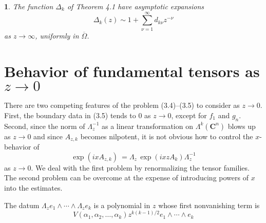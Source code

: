 \documentclass{surv-l}
\theoremstyle{plain}
\newtheorem{cor}[theorem]{\sc{Corollary}}
\theoremstyle{definition}
\numberwithin{equation}{chapter}
\begin{document}
\begin{cor}\label{chap01:coro5.18}
The function $\Delta_{k}$ of Theorem \emph{4.1} have asymptotic expansions
\setcounter{equation}{18}
\begin{equation}\label{eq5.19}
\Delta_{k}(z)\sim 1+\sum_{\nu=1}^{\infty}d_{k\nu}z^{-\nu}
\end{equation}
as $z\rightarrow\infty$, uniformly in $\overline{\Omega}$.
\end{cor}

\section{Behavior of fundamental tensors as $z\rightarrow
0$}\label{sec6}There are two competing features of the problem
(3.4)--(3.5) to consider as $z\rightarrow 0$. First, the boundary data in (3.5) tends to $0$ as $z\rightarrow 0$, except for $f_{1}$ and $g_{n}$. Second, since the norm of $\Lambda_{z}^{-1}$ as a linear transformation on $\Lambda^{k}(\mathbf{C}^{n})$ blows up as $z\rightarrow 0$ and since $A_{z,k}$ becomes nilpotent, it is not obvious how to control the $x$-behavior of
\begin{equation*}
\exp(ixA_{z,k})\ =\Lambda_{z}\,\exp(ixzA_{k})\Lambda_{z}^{-1}
\end{equation*}
as $z\rightarrow 0$. We deal with the first problem by renormalizing the tensor families. The second problem can be overcome at the expense of introducing powers of $x$ into the estimates.

The datum $\Lambda_{z}e_{1}\wedge\cdots\wedge\Lambda_{z}e_{k}$ is a polynomial in $z$ whose first nonvanishing term is
\setcounter{equation}{0}
\begin{equation}\label{eq6.1}
V(\alpha_{1}, \alpha_{2},\ldots,\alpha_{k})z^{k(k-1)/2}e_{1}\wedge\cdots \wedge e_{k}
\end{equation}
\end{document}

